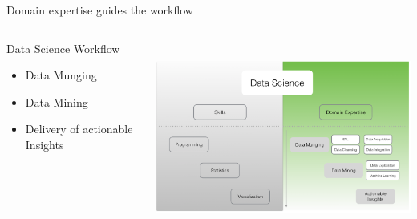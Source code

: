 \documentclass[10pt]{beamer}
\begin{document}
    \begin{frame}{Domain expertise guides the workflow}
      \begin{columns}
        \begin{column}{0.38\textwidth}
         \begin{block}{Data Science Workflow}
          \smallskip
           \begin{itemize}
             \item Data Munging
             \smallskip
             \item Data Mining
             \smallskip
             \item Delivery of actionable Insights
           \end{itemize}
         \end{block}
        \end{column}
        \begin{column}{0.6\textwidth}
          \begin{center}
            \includegraphics[height=180pt]{../graphs/data_science_domain}
          \end{center}
        \end{column}
      \end{columns}
    \end{frame}
  
\end{document}

